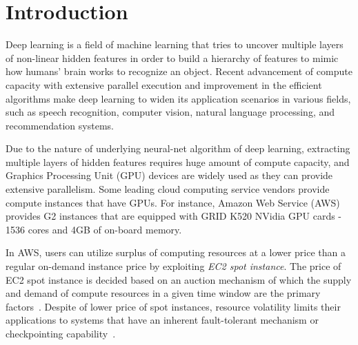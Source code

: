 \documentclass[conference]{IEEEtran}
\begin{document}
\IEEEpeerreviewmaketitle



\section{Introduction}\label{sec:intro}
Deep learning is a field of machine learning that tries to uncover multiple layers of non-linear hidden features in order to build a hierarchy of features to mimic how humans' brain works to recognize an object. Recent advancement of compute capacity with extensive parallel execution and improvement in the efficient algorithms make deep learning to widen its application scenarios in various fields, such as speech recognition, computer vision, natural language processing, and recommendation systems. 

Due to the nature of underlying neural-net algorithm of deep learning, extracting multiple layers of hidden features requires huge amount of compute capacity, and Graphics Processing Unit (GPU) devices are widely used as they can provide extensive parallelism. Some leading cloud computing service vendors provide compute instances that have GPUs. For instance, Amazon Web Service (AWS) provides G2 instances that are equipped with GRID K520 NVidia GPU cards - 1536 cores and 4GB of on-board memory. 

In AWS, users can utilize surplus of computing resources at a lower price than a regular on-demand instance price by exploiting \emph{EC2 spot instance}. The price of EC2 spot instance is decided based on an auction mechanism of which the supply and demand of compute resources in a given time window are the primary factors~\cite{spot-instance-pricing-analysis}. Despite of lower price of spot instances, resource volatility limits their applications to systems that have an inherent fault-tolerant mechanism or checkpointing capability~\cite{see-spot-run,spot-instance-checkpointing}.
\end{document}
